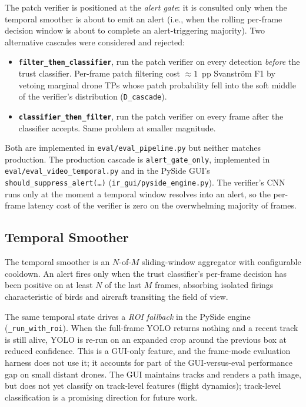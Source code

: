 The patch verifier is positioned at the \emph{alert gate}: it is consulted only when the temporal smoother is about to emit an alert (i.e., when the rolling per-frame decision window is about to complete an alert-triggering majority). Two alternative cascades were considered and rejected:

\begin{itemize}
    \item \textbf{\texttt{filter\_then\_classifier}}, run the patch verifier on every detection \emph{before} the trust classifier. Per-frame patch filtering cost $\approx 1$~pp Svanstr\"om F1 by vetoing marginal drone TPs whose patch probability fell into the soft middle of the verifier's distribution (\texttt{D\_cascade}).
    \item \textbf{\texttt{classifier\_then\_filter}}, run the patch verifier on every frame after the classifier accepts. Same problem at smaller magnitude.
\end{itemize}

Both are implemented in \texttt{eval/eval\_pipeline.py} but neither matches production. The production cascade is \texttt{alert\_gate\_only}, implemented in \texttt{eval/eval\_video\_temporal.py} and in the PySide GUI's \texttt{should\_suppress\_alert(\dots)} (\texttt{ir\_gui/pyside\_engine.py}). The verifier's CNN runs only at the moment a temporal window resolves into an alert, so the per-frame latency cost of the verifier is zero on the overwhelming majority of frames.

\subsection{Temporal Smoother}
\label{sec:temporal}

The temporal smoother is an $N$-of-$M$ sliding-window aggregator with configurable cooldown. An alert fires only when the trust classifier's per-frame decision has been positive on at least $N$ of the last $M$ frames, absorbing isolated firings characteristic of birds and aircraft transiting the field of view.

The same temporal state drives a \emph{ROI fallback} in the PySide engine (\texttt{\_run\_with\_roi}). When the full-frame YOLO returns nothing and a recent track is still alive, YOLO is re-run on an expanded crop around the previous box at reduced confidence. This is a GUI-only feature, and the frame-mode evaluation harness does not use it; it accounts for part of the GUI-versus-eval performance gap on small distant drones. The GUI maintains tracks and renders a path image, but does not yet classify on track-level features (flight dynamics); track-level classification is a promising direction for future work.

